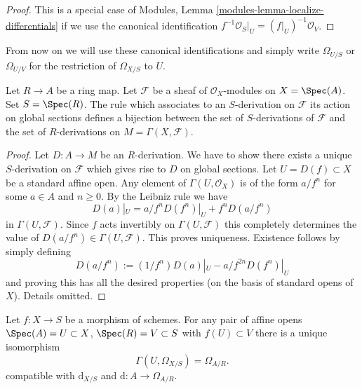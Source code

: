 \begin{proof}
This is a special case of
Modules, Lemma \ref{modules-lemma-localize-differentials}
if we use the canonical identification
$f^{-1}\mathcal{O}_S|_U = (f|_U)^{-1}\mathcal{O}_V$.
\end{proof}

\noindent
From now on we will use these canonical identifications and simply
write $\Omega_{U/S}$ or $\Omega_{U/V}$ for the restriction of
$\Omega_{X/S}$ to $U$.

\begin{lemma}
\label{lemma-affine-case-derivation}
Let $R \to A$ be a ring map. Let $\mathcal{F}$
be a sheaf of $\mathcal{O}_X$-modules
on $X = \Spec(A)$. Set $S = \Spec(R)$.
The rule which associates to an $S$-derivation on $\mathcal{F}$
its action on global sections defines a bijection between
the set of $S$-derivations of $\mathcal{F}$ and the set of
$R$-derivations on $M = \Gamma(X, \mathcal{F})$.
\end{lemma}

\begin{proof}
Let $D : A \to M$ be an $R$-derivation. We have to show there exists
a unique $S$-derivation on $\mathcal{F}$ which gives rise to
$D$ on global sections. Let $U = D(f) \subset X$ be a standard affine open.
Any element of $\Gamma(U, \mathcal{O}_X)$ is of the form
$a/f^n$ for some $a \in A$ and $n \geq 0$. By the Leibniz rule
we have
$$
D(a)|_U = a/f^n D(f^n)|_U + f^n D(a/f^n)
$$
in $\Gamma(U, \mathcal{F})$. Since $f$ acts invertibly
on $\Gamma(U, \mathcal{F})$ this completely determines
the value of $D(a/f^n) \in \Gamma(U, \mathcal{F})$.
This proves uniqueness. Existence follows by simply defining
$$
D(a/f^n) := (1/f^n) D(a)|_U - a/f^{2n} D(f^n)|_U
$$
and proving this has all the desired properties (on the basis
of standard opens of $X$). Details omitted.
\end{proof}

\begin{lemma}
\label{lemma-differentials-affine}
Let $f : X \to S$ be a morphism of schemes. For any pair of affine opens
$\Spec(A) = U \subset X$, $\Spec(R) = V \subset S$ with $f(U) \subset V$
there is a unique isomorphism
$$
\Gamma(U, \Omega_{X/S}) = \Omega_{A/R}.
$$
compatible with $\text{d}_{X/S}$ and $\text{d} : A \to \Omega_{A/R}$.
\end{lemma}

